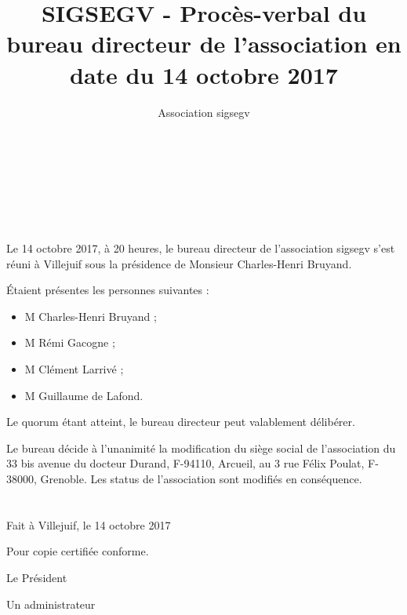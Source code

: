 \documentclass[a4paper,oneside,10pt]{article}
\begin{document}

\author{Association sigsegv}
\title{SIGSEGV - Procès-verbal du bureau directeur de l'association en date du 14 octobre 2017}

{ \\
}
\vspace{5mm}
{\centering {\textbf {\Huge -}}\\
}
\vspace{5mm}
{\\
}


\section*{}

Le 14 octobre 2017, à 20 heures, le bureau directeur de l'association sigsegv s'est réuni à Villejuif sous la présidence de Monsieur Charles-Henri Bruyand.

\'Etaient présentes les personnes suivantes :

\begin{itemize}
\item M Charles-Henri Bruyand ;
\item M Rémi Gacogne ;
\item M Clément Larrivé ;
\item M Guillaume de Lafond.
\end{itemize}

Le quorum étant atteint, le bureau directeur peut valablement délibérer.

Le bureau décide à l'unanimité la modification du siège social de l'association du 33 bis avenue du docteur Durand,
F-94110, Arcueil, au 3 rue Félix Poulat, F-38000, Grenoble.
Les status de l'association sont modifiés en conséquence.

\section*{}

Fait à Villejuif, le 14 octobre 2017

\bigskip

Pour copie certifiée conforme.

Le Président

Un administrateur
\end{document}
